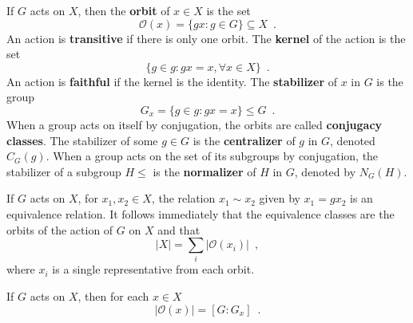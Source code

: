 \begin{definition}
	\cite[100]{Rotman1967}
	\cite[112]{DummitFoote2004}
	If $G$ acts on $X$, then the \textbf{orbit} of $x \in X$ is the set
	\begin{equation}
		\mathcal{O}(x) = \{ gx : g \in G \} \subseteq X \enspace.
	\end{equation}
	An action is \textbf{transitive} if there is only one orbit. The \textbf{kernel}
	of the action is the set
	\begin{equation}
		\{ g \in g : gx = x, \forall x \in X \} \enspace.
	\end{equation}
	An action is \textbf{faithful} if the kernel is the identity. The
	\textbf{stabilizer} of $x$ in $G$ is the group
	\begin{equation}
		G_x = \{ g \in g : gx = x \} \leq G \enspace.
	\end{equation}
	When a group acts on itself by conjugation, the orbits are called
	\textbf{conjugacy classes}. The stabilizer of some $g \in G$ is the
	\textbf{centralizer} of $g$ in $G$, denoted $C_G(g)$. When a group acts on the set of
	its subgroups by conjugation, the stabilizer of a subgroup $H \leq$ is the
	\textbf{normalizer} of $H$ in $G$, denoted by $N_G(H)$.
\end{definition}

\begin{proposition}
	\cite[102]{Rotman1967}
	\cite[114]{DummitFoote2004}
	\cite[250]{Tucker1974}
	\label{prop:equivalence-relation}
	If $G$ acts on $X$, for $x_1, x_2 \in X$, the relation $x_1 \sim x_2$ given by
	$x_1 = gx_2$ is an equivalence relation. It follows immediately that the equivalence
	classes are the orbits of the action of $G$ on $X$ and that
	\begin{equation}
		|X| = \sum_i |\mathcal{O}(x_i)| \enspace,
	\end{equation}
	where $x_i$ is a single representative from each orbit.
\end{proposition}

\begin{theorem}
	\cite[102]{Rotman1967}
	If $G$ acts on $X$, then for each $x \in X$
	\begin{equation}
		|\mathcal{O}(x)| = [G : G_x] \enspace.
	\end{equation}
\end{theorem}

